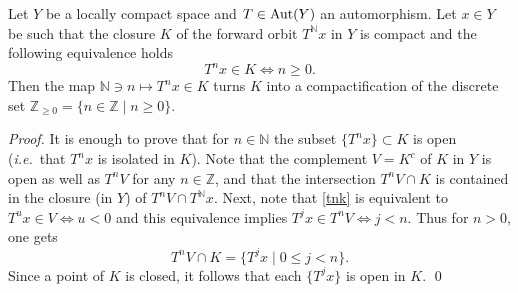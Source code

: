 \documentclass[graybox, envcountsect%
]{svmult}
\def\Aut{{\rm Aut}}
\def\N{{\mathbb N}}
\def\Z{{\mathbb Z}}
\newcommand{\ie}{{\it i.e.\/}\ }
\begin{document}
\begin{lemma}\label{compactif}
Let $Y$ be a locally compact space and $T\in \Aut(Y)$ an automorphism.
Let $x\in Y$ be such that the closure $K$ of the forward orbit $T^\N x$ in $Y$
is compact and the following equivalence holds 
\begin{equation}\label{tnk}
T^nx\in K\iff n\geq 0.	
\end{equation}
Then the map $\N\ni n\mapsto T^nx\in K$ turns $K$ into a compactification of
the discrete set $\Z_{\geq 0}=\{n\in \Z\mid n\geq 0\}$.
\end{lemma}
\begin{proof} It is enough to prove that for $n\in\N$ the subset $\{T^n x\}\subset  K$ is open (\ie that $T^nx$  is isolated in $K$).  Note that the complement $V=K^c$ of $K$ in $Y$ is open as well as $T^nV$ for any
$n\in \Z$, and that the intersection $T^nV\cap K$  is contained in the closure (in $Y$) of $T^nV\cap T^\N x$. Next, note that \eqref{tnk} is equivalent to $T^ux\in V\iff u< 0$ and this equivalence implies   $T^jx\in T^nV\iff j<n$.
Thus for $n>0$, one gets
$$
T^nV\cap K=\{T^jx\mid 0\leq j<n\}.
$$
 Since a point of $K$ is closed, it follows that each $\{T^jx\}$ is open in $K$. \qed\end{proof}
 
 
 
\end{document}
